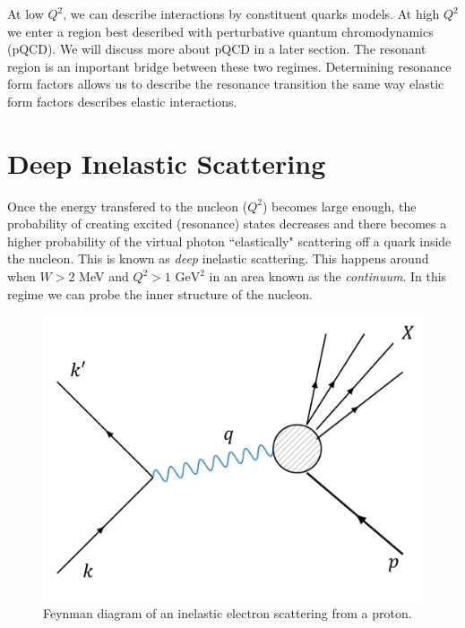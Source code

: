 At low $Q^2$, we can describe interactions by constituent quarks models. At high $Q^2$ we enter a region best described with perturbative quantum chromodynamics (pQCD). We will discuss more about pQCD in a later section. The resonant region is an important bridge between these two regimes. Determining resonance form factors allows us to describe the resonance transition the same way elastic form factors describes elastic interactions.

\section{Deep Inelastic Scattering}
Once the energy transfered to the nucleon ($Q^2$) becomes large enough, the probability of creating excited (resonance) states decreases and there becomes a higher probability of the virtual photon ``elastically" scattering off a quark inside the nucleon. This is known as \textit{deep} inelastic scattering. This happens around when $W > 2$ MeV and $Q^2 > 1$ $\mathrm{GeV}^2$ in an area known as the \textit{continuum}. In this regime we can probe the inner structure of the nucleon. 

\begin{figure}[h!]
	\centering
	\includegraphics[width=0.6\linewidth]{figures/feyn_inelscatt.png}
	\caption{Feynman diagram of an inelastic electron scattering from a proton.}
	\label{fig:feyn_inelscatt}
\end{figure}

